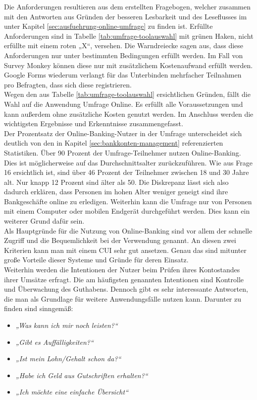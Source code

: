 Die Anforderungen resultieren \ua aus dem erstellten Fragebogen, welcher zusammen mit den Antworten aus Gründen der besseren Lesbarkeit und des Leseflusses im  unter Kapitel \ref{sec:ausfuehrung-online-umfrage} zu finden ist. Erfüllte Anforderungen sind in Tabelle \ref{tab:umfrage-toolauswahl} mit grünen Haken, nicht erfüllte mit einem roten „X“, versehen. Die Warndreiecke sagen aus, dass diese Anforderungen nur unter bestimmten Bedingungen erfüllt werden. Im Fall von Survey Monkey können diese nur mit zusätzlichem Kostenaufwand erfüllt werden. Google Forms wiederum verlangt für das Unterbinden mehrfacher Teilnahmen pro Befragten, dass sich diese registrieren.\\
Wegen den aus Tabelle \ref{tab:umfrage-toolauswahl} ersichtlichen Gründen, fällt die Wahl auf die Anwendung Umfrage Online. Es erfüllt alle Voraussetzungen und kann außerdem ohne zusätzliche Kosten genutzt werden. Im Anschluss werden die wichtigsten Ergebnisse und Erkenntnisse zusammengefasst.\\
Der Prozentsatz der Online-Banking-Nutzer in der Umfrage unterscheidet sich deutlich von den in Kapitel \ref{sec:bankkonten-management} referenzierten Statistiken. Über 90 Prozent der Umfrage-Teilnehmer nutzen Online-Banking. Dies ist möglicherweise auf das Durchschnittsalter zurückzuführen. Wie aus Frage 16 ersichtlich ist, sind über 46 Prozent der Teilnehmer zwischen 18 und 30 Jahre alt. Nur knapp 12 Prozent sind älter als 50. Die Diskrepanz lässt sich also dadurch erklären, dass Personen im hohen Alter weniger geneigt sind ihre Bankgeschäfte online zu erledigen. Weiterhin kann die Umfrage nur von Personen mit einem Computer oder mobilen Endgerät durchgeführt werden. Dies kann ein weiterer Grund dafür sein.\\
Als Hauptgründe für die Nutzung von Online-Banking sind vor allem der schnelle Zugriff und die Bequemlichkeit bei der Verwendung genannt. An diesen zwei Kriterien kann man mit einem \ac{CUI} sehr gut ansetzen. Genau das sind mitunter große Vorteile dieser Systeme und Gründe für deren Einsatz.\\
Weiterhin werden die Intentionen der Nutzer beim Prüfen ihres Kontostandes \bzw ihrer Umsätze erfragt. Die am häufigsten genannten Intentionen sind Kontrolle und Überwachung des Guthabens. Dennoch gibt es sehr interessante Antworten, die man als Grundlage für weitere Anwendungsfälle nutzen kann. Darunter zu finden sind sinngemäß:

\begin{itemize}
    \item\textit{„Was kann ich mir noch leisten?“}
    \item\textit{„Gibt es Auffälligkeiten?“}
    \item\textit{„Ist mein Lohn/Gehalt schon da?“}
    \item\textit{„Habe ich Geld aus Gutschriften erhalten?“}
    \item\textit{„Ich möchte eine einfache Übersicht“}
\end{itemize}

